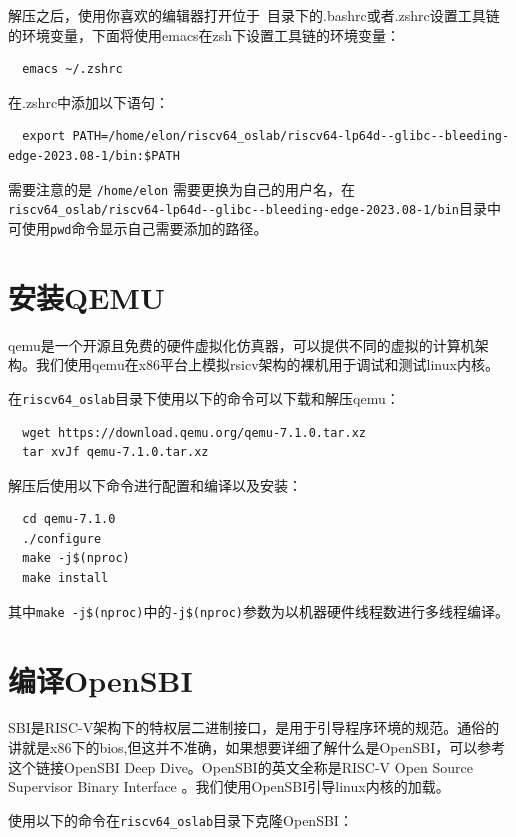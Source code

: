 \documentclass[lang=cn,10pt]{elegantbook}
\begin{document}
解压之后，使用你喜欢的编辑器打开位于~目录下的.bashrc或者.zshrc设置工具链的环境变量，下面将使用emacs在zsh下设置工具链的环境变量：

\begin{lstlisting}
  emacs ~/.zshrc
\end{lstlisting}

在.zshrc中添加以下语句：

\begin{lstlisting}
  export PATH=/home/elon/riscv64_oslab/riscv64-lp64d--glibc--bleeding-edge-2023.08-1/bin:$PATH
\end{lstlisting}

需要注意的是 \lstinline{/home/elon} 需要更换为自己的用户名，在\lstinline{riscv64_oslab/riscv64-lp64d--glibc--bleeding-edge-2023.08-1/bin}目录中可使用\lstinline{pwd}命令显示自己需要添加的路径。

\section{安装QEMU}
qemu是一个开源且免费的硬件虚拟化仿真器，可以提供不同的虚拟的计算机架构。我们使用qemu在x86平台上模拟rsicv架构的裸机用于调试和测试linux内核。

在\lstinline{riscv64_oslab}目录下使用以下的命令可以下载和解压qemu：

\begin{lstlisting}
  wget https://download.qemu.org/qemu-7.1.0.tar.xz
  tar xvJf qemu-7.1.0.tar.xz  
\end{lstlisting}

解压后使用以下命令进行配置和编译以及安装：

\begin{lstlisting}
  cd qemu-7.1.0
  ./configure
  make -j$(nproc)	
  make install
\end{lstlisting}

其中\lstinline{make -j$(nproc)}中的\lstinline{-j$(nproc)}参数为以机器硬件线程数进行多线程编译。

\section{编译OpenSBI}
SBI是RISC-V架构下的特权层二进制接口，是用于引导程序环境的规范。通俗的讲就是x86下的bios,但这并不准确，如果想要详细了解什么是OpenSBI，可以参考这个链接OpenSBI Deep Dive。OpenSBI的英文全称是RISC-V Open Source Supervisor Binary Interface 。我们使用OpenSBI引导linux内核的加载。

使用以下的命令在\lstinline{riscv64_oslab}目录下克隆OpenSBI：
\end{document}
